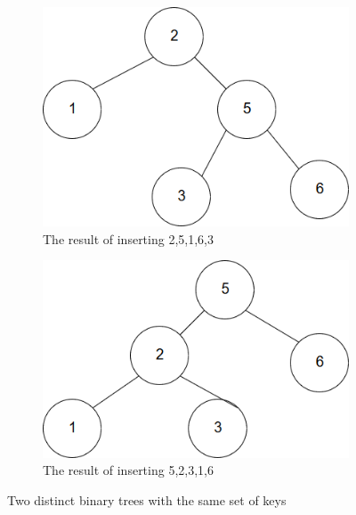 \documentclass{article}
\begin{document}
\begin{enumerate}
  \begin{figure}[H]
    \centering
    \begin{subfigure}{.5\textwidth}
      \centering
      \includegraphics[width=.98\linewidth]{BinaryTree1}
      \caption{The result of inserting 2,5,1,6,3}
      \label{fig:BinaryTree:sub1}
    \end{subfigure}%
    \begin{subfigure}{.5\textwidth}
      \centering
      \includegraphics[width=.98\linewidth]{BinaryTree2}
      \caption{The result of inserting 5,2,3,1,6}
      \label{fig:BinaryTree:sub2}
    \end{subfigure}
    \caption{Two distinct binary trees with the same set of keys}
    \label{fig:BinaryTree}
  \end{figure}


\end{enumerate}
\end{document}
